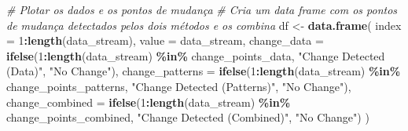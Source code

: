 \documentclass[
]{article}
\newenvironment{Shaded}{\begin{snugshade}}{\end{snugshade}}
\newcommand{\AttributeTok}[1]{\textcolor[rgb]{0.13,0.29,0.53}{#1}}
\newcommand{\CommentTok}[1]{\textcolor[rgb]{0.56,0.35,0.01}{\textit{#1}}}
\newcommand{\DecValTok}[1]{\textcolor[rgb]{0.00,0.00,0.81}{#1}}
\newcommand{\FunctionTok}[1]{\textcolor[rgb]{0.13,0.29,0.53}{\textbf{#1}}}
\newcommand{\NormalTok}[1]{#1}
\newcommand{\OtherTok}[1]{\textcolor[rgb]{0.56,0.35,0.01}{#1}}
\newcommand{\SpecialCharTok}[1]{\textcolor[rgb]{0.81,0.36,0.00}{\textbf{#1}}}
\newcommand{\StringTok}[1]{\textcolor[rgb]{0.31,0.60,0.02}{#1}}
\begin{document}
\begin{Shaded}
\begin{Highlighting}[]
\CommentTok{\# Plotar os dados e os pontos de mudança}
\CommentTok{\# Cria um data frame com os pontos de mudança detectados pelos dois métodos e os combina}
\NormalTok{df }\OtherTok{\textless{}{-}} \FunctionTok{data.frame}\NormalTok{(}
  \AttributeTok{index =} \DecValTok{1}\SpecialCharTok{:}\FunctionTok{length}\NormalTok{(data\_stream),}
  \AttributeTok{value =}\NormalTok{ data\_stream,}
  \AttributeTok{change\_data =} \FunctionTok{ifelse}\NormalTok{(}\DecValTok{1}\SpecialCharTok{:}\FunctionTok{length}\NormalTok{(data\_stream) }\SpecialCharTok{\%in\%}\NormalTok{ change\_points\_data, }\StringTok{"Change Detected (Data)"}\NormalTok{, }\StringTok{"No Change"}\NormalTok{),}
  \AttributeTok{change\_patterns =} \FunctionTok{ifelse}\NormalTok{(}\DecValTok{1}\SpecialCharTok{:}\FunctionTok{length}\NormalTok{(data\_stream) }\SpecialCharTok{\%in\%}\NormalTok{ change\_points\_patterns, }\StringTok{"Change Detected (Patterns)"}\NormalTok{, }\StringTok{"No Change"}\NormalTok{),}
  \AttributeTok{change\_combined =} \FunctionTok{ifelse}\NormalTok{(}\DecValTok{1}\SpecialCharTok{:}\FunctionTok{length}\NormalTok{(data\_stream) }\SpecialCharTok{\%in\%}\NormalTok{ change\_points\_combined, }\StringTok{"Change Detected (Combined)"}\NormalTok{, }\StringTok{"No Change"}\NormalTok{)}
\NormalTok{)}


\end{Highlighting}
\end{Shaded}
\end{document}
